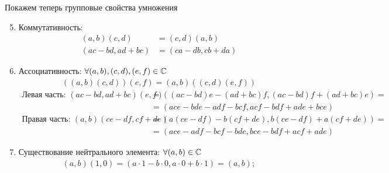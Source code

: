 \documentclass{article}
\begin{document}
Покажем теперь групповые свойства умножения
\begin{enumerate}
	\setcounter{enumi}{4}
	\item{}Коммутативность:
	\begin{align*}
		(a,b)(c,d)    & =(c,d)(a,b)    \\
		(ac-bd,ad+bc) & =(ca-db,cb+da)
	\end{align*}

	\pagebreak

	\item{}Ассоциативность: $\forall (a,b),(c,d),(e,f)\in\mathbb{C}$
	\begin{align*}
		((a,b)(c,d))(e,f)=(a,b)((c,d)(e,f))
	\end{align*}
	\begin{align*}
		\text{Левая часть: }(ac-bd, ad+bc)(e,f)      & = ((ac-bd)e - (ad+bc)f, (ac-bd)f + (ad+bc)e) =         \\
		                                             & = (ace - bde - adf - bcf, acf - bdf + ade + bce)       \\
		\text{Правая часть: }(a,b)(ce - df, cf + de) & = (a(ce - df) - b(cf + de), b(ce - df) + a(cf + de)) = \\
		                                             & = (ace - adf - bcf - bde, bce - bdf + acf + ade)
	\end{align*}

	\item{}Существование нейтрального элемента: $\forall (a,b)\in\mathbb{C}$
	\begin{align*}
		(a,b)(1,0)=(a\cdot 1-b\cdot 0,a\cdot 0+b\cdot 1)=(a,b);
	\end{align*}


\end{enumerate}
\end{document}
